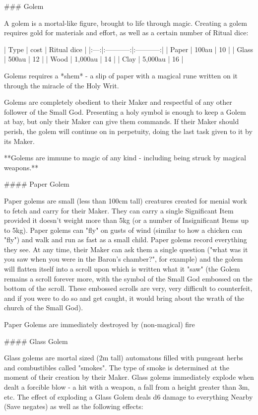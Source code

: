 ### Golem

A golem is a mortal-like figure, brought to life through magic.  Creating a golem requires gold for materials and effort, as well as a certain number of Ritual dice:

| Type  | {cost} | Ritual dice | 
|:---:|:-----------:|:-----------:|
|  Paper  | 100au  | 10 |
|  Glass  | 500au  | 12 |
|  Wood  | 1,000au  | 14 |
|  Clay  | 5,000au  | 16 |


Golems requires a *shem* - a slip of paper with a magical rune written on it through the miracle of the Holy Writ.

Golems are completely obedient to their Maker and respectful of any other follower of the Small God.  Presenting a holy symbol is enough to keep a Golem at bay, but only their Maker can give them commands.  If their Maker should perish, the golem will continue on in perpetuity, doing the last task given to it by its Maker.



**Golems are immune to magic of any kind - including being struck by magical weapons.**  

#### Paper Golem

Paper golems are small (less than 100cm tall) creatures created for menial work to fetch and carry for their Maker.  They can carry a single Significant Item provided it doesn't weight more than 5kg (or a number of Insignificant Items up to 5kg).  Paper golems can "fly" on gusts of wind (similar to how a chicken can "fly") and walk and run as fast as a small child.  Paper golems record everything they see.  At any time, their Maker can ask them a single question ("what was it you saw when you were in the Baron's chamber?", for example) and the golem will flatten itself into a scroll upon which is written what it "saw" (the Golem remains a scroll forever more, with the symbol of the Small God embossed on the bottom of the scroll.  These embossed scrolls are very, very difficult to counterfeit, and if you were to do so and get caught, it would bring about the wrath of the church of the Small God). 

Paper Golems are immediately destroyed by (non-magical) fire

#### Glass Golem

Glass golems are mortal sized (2m tall) automatons filled with pungeant herbs and combustibles called "smokes".  The type of smoke is determined at the moment of their creation by their Maker. Glass golems immediately explode when dealt a forcible blow - a hit with a weapon, a fall from a height greater than 3m, etc.  The effect of exploding a Glass Golem deals d6 damage to everything Nearby (Save negates) as well as the following effects:

